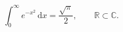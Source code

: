\documentclass{article}
\begin{document}
\begin{equation}
  \int_0^\infty e^{-x^2}\,\mathrm{d}x = \frac{\sqrt{\pi}}{2}, \qquad \mathbb{R} \subset \mathbb{C}.
\end{equation}
\end{document}

